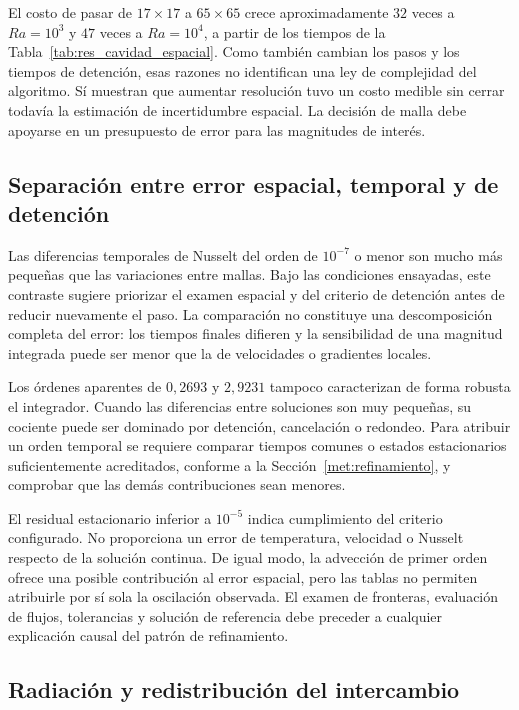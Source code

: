 El costo de pasar de $17\times17$ a $65\times65$ crece aproximadamente $32$ veces a $Ra=10^3$ y $47$ veces a $Ra=10^4$, a partir de los tiempos de la Tabla~\ref{tab:res_cavidad_espacial}. Como también cambian los pasos y los tiempos de detención, esas razones no identifican una ley de complejidad del algoritmo. Sí muestran que aumentar resolución tuvo un costo medible sin cerrar todavía la estimación de incertidumbre espacial. La decisión de malla debe apoyarse en un presupuesto de error para las magnitudes de interés.

\subsection{Separación entre error espacial, temporal y de detención}

Las diferencias temporales de Nusselt del orden de $10^{-7}$ o menor son mucho más pequeñas que las variaciones entre mallas. Bajo las condiciones ensayadas, este contraste sugiere priorizar el examen espacial y del criterio de detención antes de reducir nuevamente el paso. La comparación no constituye una descomposición completa del error: los tiempos finales difieren y la sensibilidad de una magnitud integrada puede ser menor que la de velocidades o gradientes locales.

Los órdenes aparentes de $0{,}2693$ y $2{,}9231$ tampoco caracterizan de forma robusta el integrador. Cuando las diferencias entre soluciones son muy pequeñas, su cociente puede ser dominado por detención, cancelación o redondeo. Para atribuir un orden temporal se requiere comparar tiempos comunes o estados estacionarios suficientemente acreditados, conforme a la Sección~\ref{met:refinamiento}, y comprobar que las demás contribuciones sean menores.

El residual estacionario inferior a $10^{-5}$ indica cumplimiento del criterio configurado. No proporciona un error de temperatura, velocidad o Nusselt respecto de la solución continua. De igual modo, la advección de primer orden ofrece una posible contribución al error espacial, pero las tablas no permiten atribuirle por sí sola la oscilación observada. El examen de fronteras, evaluación de flujos, tolerancias y solución de referencia debe preceder a cualquier explicación causal del patrón de refinamiento.

\subsection{Radiación y redistribución del intercambio}

